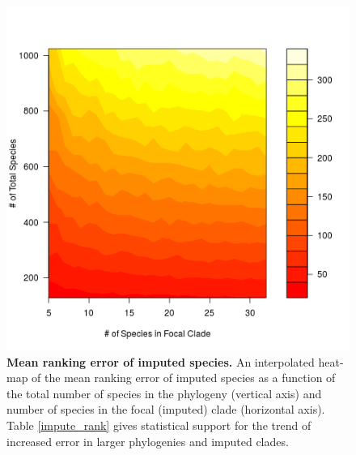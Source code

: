 \documentclass[10pt,english]{article}
\begin{document}
\begin{figure}[!ht]
  \center
  \includegraphics[width=.5\textwidth]{../figures/rankingError.png}
  \caption{\textbf{Mean ranking error of imputed species.} An
    interpolated heat-map of the mean ranking error of imputed species
    as a function of the total number of species in the phylogeny
    (vertical axis) and number of species in the focal (imputed) clade
    (horizontal axis). Table \ref{impute_rank} gives statistical
    support for the trend of increased error in larger phylogenies and
    imputed clades.}
  \label{rankingError}
\end{figure}
\end{document}
